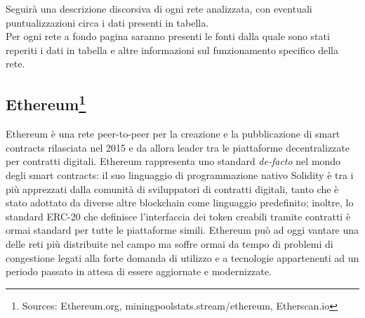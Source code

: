 \documentclass[a4paper, 12pt]{article}
\begin{document}
\bigskip
\noindent
Seguirà una descrizione discorsiva di ogni rete analizzata, con eventuali puntualizzazioni circa i dati presenti in tabella.\\
Per ogni rete a fondo pagina saranno presenti le fonti dalla quale sono stati reperiti i dati in tabella e altre informazioni sul funzionamento
specifico della rete.

\newpage
\subsection*{Ethereum\footnote{Sources: Ethereum.org, miningpoolstats.stream/ethereum, Etherscan.io}}
Ethereum è una rete peer-to-peer per la creazione e la pubblicazione di smart contracts rilasciata nel 2015 e da allora leader tra le piattaforme decentralizzate
per contratti digitali.
Ethereum rappresenta uno standard \textit{de-facto} nel mondo degli smart contracts: il suo linguaggio di programmazione nativo Solidity è
tra i più apprezzati dalla comunità di sviluppatori di contratti digitali, tanto che è stato adottato da diverse altre blockchain come linguaggio predefinito; inoltre, lo standard ERC-20 che definisce l'interfaccia dei token creabili tramite contratti è ormai standard per tutte le piattaforme simili.
Ethereum può ad oggi vantare una delle reti più distribuite nel campo ma soffre ormai da tempo di problemi di congestione legati alla forte domanda di utilizzo e a tecnologie appartenenti ad un periodo passato in attesa di essere aggiornate e modernizzate.
\end{document}
